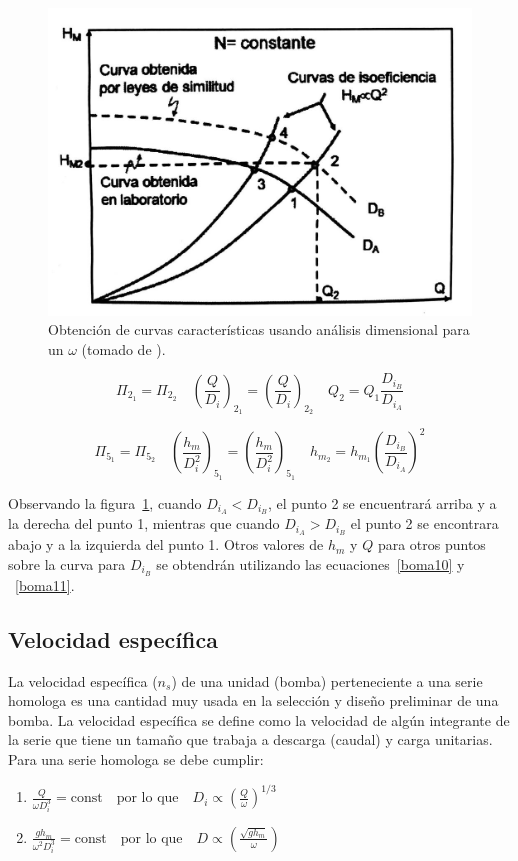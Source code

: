 \documentclass[11pt, oneside]{article}
\begin{document}
\begin{figure}[h]
\centering
\includegraphics[width=12cm]{./figs/bom9.jpeg}
\caption{Obtenci\'on de curvas caracter\'isticas usando an\'alisis dimensional para un $\omega$ (tomado de \cite{agudelo2011mecanica}).} 
\label{bom9}
\end{figure}


\begin{equation}
\Pi_{2_1} = \Pi_{2_2} \quad \left( \frac{Q}{D_i} \right)_{2_1} = \left( \frac{Q}{D_i} \right)_{2_2} \quad Q_2 = Q_1 \frac{D_{i_B}}{D_{i_A}}
\label{boma10}
\end{equation}

\begin{equation}
\Pi_{5_1} = \Pi_{5_2} \quad \left( \frac{h_m}{D_i^2} \right)_{5_1} = \left( \frac{h_m}{D_i^2} \right)_{5_1} \quad h_{m_2} = h_{m_1} \left(\frac{D_{i_B}}{D_{i_A}}\right)^2
\label{boma11}
\end{equation}
 
Observando la figura~\ref{bom9}, cuando $D_{i_A} < D_{i_B}$, el punto 2 se encuentrar\'a arriba y a la derecha del punto 1, mientras que cuando $D_{i_A} > D_{i_B}$ el punto 2 se encontrara abajo y a la izquierda del punto 1. Otros valores de $h_m$ y $Q$ para otros puntos sobre la curva para $D_{i_B}$ se obtendr\'an utilizando las ecuaciones~\ref{boma10} y ~\ref{boma11}. 

\subsection{Velocidad espec\'ifica}
La velocidad espec\'ifica ($n_s$) de una unidad (bomba) perteneciente a una serie homologa es una cantidad muy usada en la selecci\'on y dise\~no preliminar de una bomba. La velocidad espec\'ifica se define como la velocidad de alg\'un integrante de la serie que tiene un tama\~no que trabaja a descarga (caudal) y carga unitarias. Para una serie homologa se debe cumplir:
\begin{enumerate} 
\item $ \frac{Q}{\omega D_i^3} = \text{const} \quad \text{por lo que} \quad D_i \propto \left( \frac{Q}{\omega} \right)^{1/3} $
\item $ \frac{g h_m}{\omega^2 D_i^3} = \text{const} \quad \text{por lo que} \quad D \propto \left( \frac{\sqrt{g h_m}}{\omega} \right) $
\end{enumerate} 
\end{document}
